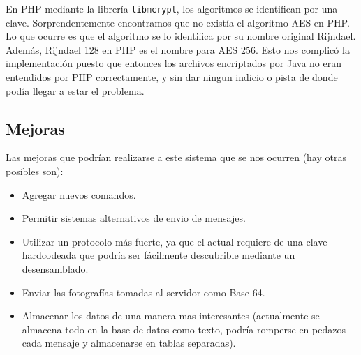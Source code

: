 En PHP mediante la librería \texttt{libmcrypt}, los algoritmos se identifican
por una clave. Sorprendentemente encontramos que no existía el algoritmo AES
en PHP. Lo que ocurre es que el algoritmo se lo identifica por su nombre original
Rijndael. Además, Rijndael 128 en PHP es el nombre para AES 256. Esto nos
complicó la implementación puesto que entonces los archivos encriptados por
Java no eran entendidos por PHP correctamente, y sin dar ningun indicio o pista
de donde podía llegar a estar el problema.

\subsection{Mejoras}

Las mejoras que podrían realizarse a este sistema que se nos ocurren (hay otras
posibles son):

\begin{itemize}
	\item Agregar nuevos comandos.
	\item Permitir sistemas alternativos de envio de mensajes.
	\item Utilizar un protocolo más fuerte, ya que el actual requiere de una
	clave hardcodeada que podría ser fácilmente descubrible mediante un 
	desensamblado.
	\item Enviar las fotografías tomadas al servidor como Base 64.
	\item Almacenar los datos de una manera mas interesantes (actualmente se
	almacena todo en la base de datos como texto, podría romperse en pedazos
	cada mensaje y almacenarse en tablas separadas).
\end{itemize}

